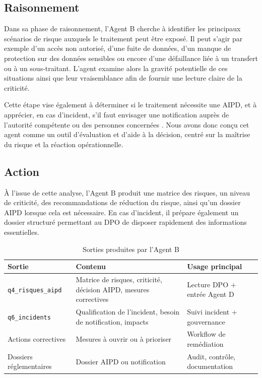 \documentclass[12pt,a4paper]{report}
\begin{document}
\subsection{Raisonnement}

Dans sa phase de raisonnement, l'Agent B cherche à identifier les principaux scénarios de risque auxquels le traitement peut être exposé. Il peut s'agir par exemple d'un accès non autorisé, d'une fuite de données, d'un manque de protection sur des données sensibles ou encore d'une défaillance liée à un transfert ou à un sous-traitant. L'agent examine alors la gravité potentielle de ces situations ainsi que leur vraisemblance afin de fournir une lecture claire de la criticité.

Cette étape vise également à déterminer si le traitement nécessite une AIPD, et à apprécier, en cas d'incident, s'il faut envisager une notification auprès de l'autorité compétente ou des personnes concernées \cite{rgpd,cnil_aipd,cnil_breach}. Nous avons donc conçu cet agent comme un outil d'évaluation et d'aide à la décision, centré sur la maîtrise du risque et la réaction opérationnelle.

\subsection{Action}

À l'issue de cette analyse, l'Agent B produit une matrice des risques, un niveau de criticité, des recommandations de réduction du risque, ainsi qu'un dossier AIPD lorsque cela est nécessaire. En cas d'incident, il prépare également un dossier structuré permettant au DPO de disposer rapidement des informations essentielles.

\begin{table}[H]
\centering
\caption{Sorties produites par l'Agent B}
\label{tab:outputs_agent_b}
\begin{tabularx}{\textwidth}{|p{3cm}|X|p{3.2cm}|}
\hline
\textbf{Sortie} & \textbf{Contenu} & \textbf{Usage principal} \\
\hline
\texttt{q4\_risques\_aipd} & Matrice de risques, criticité, décision AIPD, mesures correctives & Lecture DPO + entrée Agent D \\
\hline
\texttt{q6\_incidents} & Qualification de l'incident, besoin de notification, impacts & Suivi incident + gouvernance \\
\hline
Actions correctives & Mesures à ouvrir ou à prioriser & Workflow de remédiation \\
\hline
Dossiers réglementaires & Dossier AIPD ou notification & Audit, contrôle, documentation \\
\hline
\end{tabularx}
\end{table}
\end{document}
